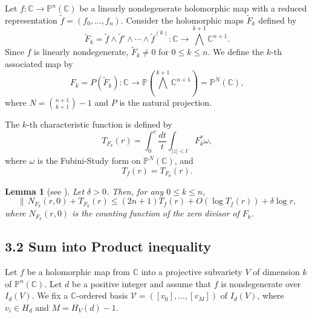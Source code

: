 \documentclass[12pt]{amsart}
\newtheorem{lemma}[theorem]{Lemma}
\newcommand{\C}{{\mathbb{C}}}
\renewcommand{\P}{{\mathbb{P}}}
\begin{document}
Let $f : \C \to \mathbb{P}^n(\mathbb{C})$ be a linearly nondegenerate holomorphic map with a reduced representation $\tilde f=(f_0,\ldots,f_n)$. 
Consider the holomorphic maps $\tilde F_k$ defined by
$$\tilde F_k = \tilde f \wedge\tilde f' \wedge \cdots \wedge\tilde  f^{(k)} : \mathbb{C} \to \bigwedge^{k+1} \mathbb{C}^{n+1}.$$
Since $f$ is linearly nondegenerate, $\tilde F_k \neq 0$ for $0 \le k \le n$.  
We define the $k$-th associated map by
$$F_k = P(\tilde F_k) : \mathbb{C} \to \mathbb{P}(\bigwedge^{k+1} \mathbb{C}^{n+1})=\mathbb{P}^N(\mathbb{C}),$$ 
where $N = \binom{n+1}{k+1} - 1$ and $P$ is the natural projection.

The $k$-th characteristic function is defined by
$$T_{F_k}(r) = \int_0^r \frac{dt}{t} \int_{|z|<t} F_k^* \omega,$$
where $\omega$ is the Fubini-Study form on $\mathbb{P}^N(\mathbb{C})$, and
$$T_f(r) = T_{F_0}(r).$$

\begin{lemma}[{see \cite[Lemma 4.2]{RCD}}]\label{3.1}
Let $\delta > 0$. Then, for any $0 \le k \le n$,
$$\big\|\, N_{F_k}(r, 0) + T_{F_k}(r) \le (2n+1) T_f(r) + O(\log T_f(r)) + \delta \log r,$$
where $N_{F_k}(r, 0)$ is the counting function of the zero divisor of $F_k$.
\end{lemma}

\subsection*{3.2 Sum into Product inequality}

Let $f$ be a holomorphic map from $\C$ into a projective subvariety $V$ of dimension $k$ of $\P^n(\C)$. Let $d$ be a positive integer and assume that $f$ is nondegenerate over $I_d(V)$. We fix a $\C$-ordered basis $\mathcal V=([v_0],\ldots,[v_M])$ of $I_d(V)$, where $v_i\in H_d$ and $M=H_V(d)-1$.  
\end{document}
